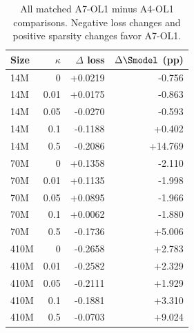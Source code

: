 \begin{table}[p]\centering\small\renewcommand{\arraystretch}{0.95}
\caption{All matched A7-OL1 minus A4-OL1 comparisons. Negative loss changes and positive sparsity changes favor A7-OL1.}\label{tab:scale-pairs-full}
\begin{tabular}{@{}lrrr@{}}
\toprule
Size & $\kappa$ & $\Delta$ loss & $\Delta\Smodel$ (pp) \\
\midrule
14M & 0 & +0.0219 & -0.756 \\
14M & 0.01 & +0.0175 & -0.863 \\
14M & 0.05 & -0.0270 & -0.593 \\
14M & 0.1 & -0.1188 & +0.402 \\
14M & 0.5 & -0.2086 & +14.769 \\
70M & 0 & +0.1358 & -2.110 \\
70M & 0.01 & +0.1135 & -1.998 \\
70M & 0.05 & +0.0895 & -1.966 \\
70M & 0.1 & +0.0062 & -1.880 \\
70M & 0.5 & -0.1736 & +5.006 \\
410M & 0 & -0.2658 & +2.783 \\
410M & 0.01 & -0.2582 & +2.329 \\
410M & 0.05 & -0.2111 & +1.929 \\
410M & 0.1 & -0.1881 & +3.310 \\
410M & 0.5 & -0.0703 & +9.024 \\
\bottomrule
\end{tabular}
\end{table}

